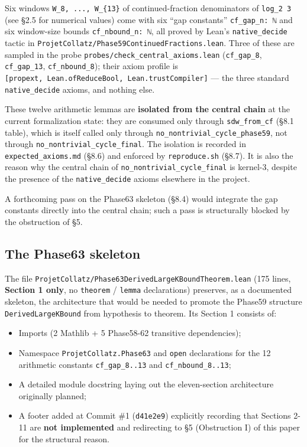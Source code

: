 \documentclass[
  11pt]{amsart}
\providecommand{\tightlist}{%
  \setlength{\itemsep}{0pt}\setlength{\parskip}{0pt}}
\theoremstyle{plain}
\theoremstyle{definition}
\theoremstyle{remark}
\begin{document}
Six windows \texttt{W\_8,\ ...,\ W\_\{13\}} of continued-fraction
denominators of \texttt{log\_2\ 3} (see §2.5 for numerical values) come
with six ``gap constants'' \texttt{cf\_gap\_n:\ ℕ} and six window-size
bounds \texttt{cf\_nbound\_n:\ ℕ}, all proved by Lean's
\texttt{native\_decide} tactic in
\texttt{ProjetCollatz/Phase59ContinuedFractions.lean}. Three of these
are sampled in the probe \texttt{probes/check\_central\_axioms.lean}
(\texttt{cf\_gap\_8}, \texttt{cf\_gap\_13}, \texttt{cf\_nbound\_8});
their axiom profile is
\texttt{{[}propext,\ Lean.ofReduceBool,\ Lean.trustCompiler{]}} --- the
three standard \texttt{native\_decide} axioms, and nothing else.

These twelve arithmetic lemmas are \textbf{isolated from the central
chain} at the current formalization state: they are consumed only
through \texttt{sdw\_from\_cf} (§8.1 table), which is itself called only
through \texttt{no\_nontrivial\_cycle\_phase59}, not through
\texttt{no\_nontrivial\_cycle\_final}. The isolation is recorded in
\texttt{expected\_axioms.md} (§8.6) and enforced by
\texttt{reproduce.sh} (§8.7). It is also the reason why the central
chain of \texttt{no\_nontrivial\_cycle\_final} is kernel-3, despite the
presence of the \texttt{native\_decide} axioms elsewhere in the project.

A forthcoming pass on the Phase63 skeleton (§8.4) would integrate the
gap constants directly into the central chain; such a pass is
structurally blocked by the obstruction of §5.

\subsection{The Phase63 skeleton}\label{the-phase63-skeleton}

The file \texttt{ProjetCollatz/Phase63DerivedLargeKBoundTheorem.lean}
(175 lines, \textbf{Section 1 only}, no \texttt{theorem} /
\texttt{lemma} declarations) preserves, as a documented skeleton, the
architecture that would be needed to promote the Phase59 structure
\texttt{DerivedLargeKBound} from hypothesis to theorem. Its Section 1
consists of:

\begin{itemize}
\tightlist
\item
  Imports (2 Mathlib + 5 Phase58-62 transitive dependencies);
\item
  Namespace \texttt{ProjetCollatz.Phase63} and \texttt{open}
  declarations for the 12 arithmetic constants \texttt{cf\_gap\_8..13}
  and \texttt{cf\_nbound\_8..13};
\item
  A detailed module docstring laying out the eleven-section architecture
  originally planned;
\item
  A footer added at Commit \#1 (\texttt{d41e2e9}) explicitly recording
  that Sections 2-11 are \textbf{not implemented} and redirecting to §5
  (Obstruction I) of this paper for the structural reason.
\end{itemize}
\end{document}
